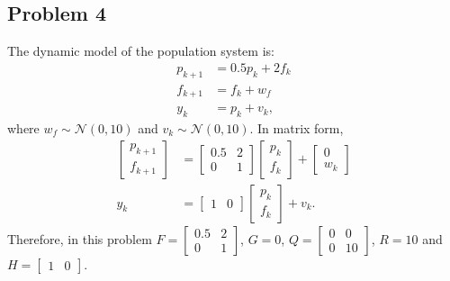 \subsection*{Problem 4}
The dynamic model of the population system is:
\begin{align*}
	p_{k+1} &= 0.5p_k + 2f_k\\
	f_{k+1} &= f_k + w_f\\
	y_k &= p_k + v_k,
\end{align*}
where $w_f \sim \mathcal{N}(0, 10)$ and $v_k \sim \mathcal{N}(0,10)$. In matrix form,
\begin{align*}
	\begin{bmatrix}p_{k+1}\\f_{k+1}\end{bmatrix} &= \begin{bmatrix}0.5&2\\0&1\end{bmatrix}\begin{bmatrix}p_k\\f_k\end{bmatrix} + \begin{bmatrix}0\\w_k\end{bmatrix}\\
	y_k &= \begin{bmatrix}1&0\end{bmatrix}\begin{bmatrix}p_k\\f_k\end{bmatrix}+v_k.
\end{align*}
Therefore, in this problem $F = \begin{bmatrix}0.5&2\\0&1\end{bmatrix}$, $G=0$, $Q=\begin{bmatrix}0&0\\0&10\end{bmatrix}$, $R=10$ and $H = \begin{bmatrix}1&0\end{bmatrix}$.
